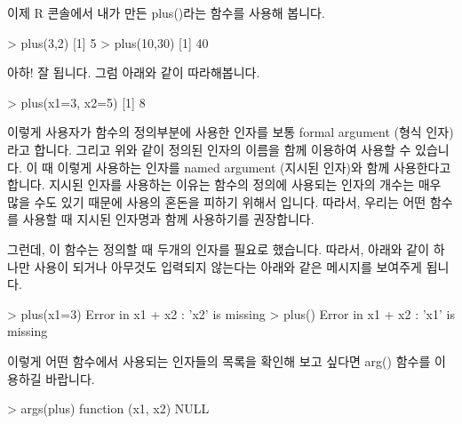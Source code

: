 
%
%
%


이제 R 콘솔에서 내가 만든 plus()라는 함수를 사용해 봅니다. 

\begin{Schunk}
\begin{Soutput}
> plus(3,2)
[1] 5
> plus(10,30)
[1] 40
\end{Soutput}
\end{Schunk}

아하! 잘 됩니다. 
그럼 아래와 같이 따라해봅니다. 
\begin{Schunk}
\begin{Soutput}
> plus(x1=3, x2=5)
[1] 8
\end{Soutput}
\end{Schunk}

이렇게 사용자가 함수의 정의부분에 사용한 인자를 보통 formal argument (형식 인자)라고 합니다. 
그리고 위와 같이 정의된 인자의 이름을 함께 이용하여 사용할 수 있습니다. 
이 때 이렇게 사용하는 인자를  named argument (지시된 인자)와 함께 사용한다고 합니다. 
지시된 인자를 사용하는 이유는 함수의 정의에 사용되는 인자의 개수는 매우 많을 수도 있기 때문에 사용의 혼돈을 피하기 위해서 입니다. 
따라서, 우리는 어떤 함수를 사용할 때 지시된 인자명과 함께 사용하기를 권장합니다. 

그런데, 이 함수는 정의할 때 두개의 인자를 필요로 했습니다. 
따라서, 아래와 같이 하나만 사용이 되거나 아무것도 입력되지 않는다는 아래와 같은 메시지를 보여주게 됩니다. 

\begin{Schunk}
\begin{Soutput}
> plus(x1=3)
Error in x1 + x2 : 'x2' is missing
> plus()
Error in x1 + x2 : 'x1' is missing
\end{Soutput}
\end{Schunk}

이렇게 어떤 함수에서 사용되는 인자들의 목록을 확인해 보고 싶다면 arg() 함수를 이용하길 바랍니다. 

\begin{Schunk}
\begin{Soutput}
> args(plus)
function (x1, x2) 
NULL

\end{Soutput}
\end{Schunk}

